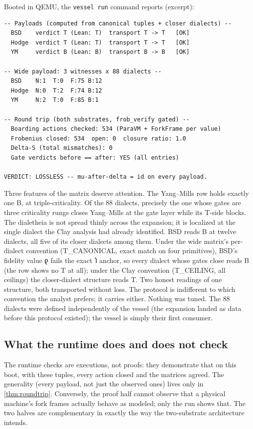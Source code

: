 \documentclass[12pt,a4paper]{article}
\newcommand{\shav}[1]{{\shavfont #1}}
\newcommand{\bT}{\textsf{T}}
\newcommand{\bB}{\textsf{B}}
\begin{document}
Booted in QEMU, the \texttt{vessel run} command reports (excerpt):

\begin{lstlisting}[caption={QEMU serial output (excerpt).}]
-- Payloads (computed from canonical tuples + closer dialects) --
  BSD    verdict T (Lean: T)  transport T -> T   [OK]
  Hodge  verdict T (Lean: T)  transport T -> T   [OK]
  YM     verdict B (Lean: B)  transport B -> B   [OK]

-- Wide payload: 3 witnesses x 88 dialects --
  BSD    N:1  T:0  F:75 B:12
  Hodge  N:0  T:2  F:74 B:12
  YM     N:2  T:0  F:85 B:1

-- Round trip (both substrates, frob_verify gated) --
  Boarding actions checked: 534 (ParaVM + ForkFrame per value)
  Frobenius closed: 534  open: 0  closure ratio: 1.0
  Delta-S (total mismatches): 0
  Gate verdicts before == after: YES (all entries)

VERDICT: LOSSLESS -- mu-after-delta = id on every payload.
\end{lstlisting}

Three features of the matrix deserve attention.  The Yang--Mills row holds
exactly one \bB{}, at triple-criticality.  Of the $88$ dialects, precisely the
one whose gates are three criticality rungs closes Yang--Mills at the gate layer
while its T-side blocks.  The dialetheia is not spread thinly across the
expansion; it is localized at the single dialect the Clay analysis had already
identified.  BSD reads \bB{} at twelve dialects, all five of its closer
dialects among them.  Under the wide matrix's per-dialect convention
(T\_CANONICAL, exact match on four primitives), BSD's fidelity value \shav{𐑞}
fails the exact \shav{𐑐} anchor, so every dialect whose gates close reads
\bB{} (the row shows no \bT{} at all); under the Clay convention (T\_CEILING,
all ceilings) the closer-dialect structure reads \bT{}.  Two honest readings
of one structure, both transported without loss.  The protocol is indifferent to
which convention the analyst prefers; it carries either.  Nothing was tuned.  The
$88$ dialects were defined independently of the vessel (the expansion landed as
data before this protocol existed); the vessel is simply their first consumer.

\subsection{What the runtime does and does not check}

The runtime checks are executions, not proofs: they demonstrate that on this
boot, with these tuples, every action closed and the matrices agreed.  The
generality (every payload, not just the observed ones) lives only in
\cref{thm:roundtrip}.  Conversely, the proof half cannot observe that a physical
machine's fork frames actually behave as modeled; only the run shows that.  The
two halves are complementary in exactly the way the two-substrate architecture
intends.
\end{document}
